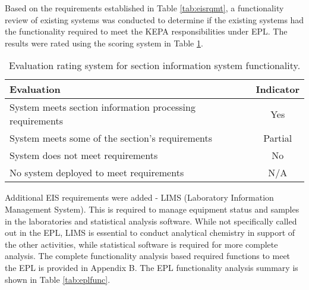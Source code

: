 Based on the requirements established in Table \ref{tab:eisrqmt}, a functionality review of existing systems was conducted to determine if the existing systems had the functionality required to meet the KEPA responsibilities under EPL. The results were rated using the scoring system in Table \ref{tab:funcclass}.

\begin{table}[H]
\centering
\caption{Evaluation rating system for section information system functionality.}
\label{tab:funcclass}
\begin{tabular}{@{}lc@{}}
\toprule
\textbf{Evaluation} & \textbf{Indicator} \\ \midrule
System meets section information processing requirements & Yes \\
System meets some of the section's requirements & Partial \\
System does not meet requirements & No \\
No system deployed to meet requirements & N/A \\ \bottomrule
\end{tabular}
\end{table} 

Additional EIS requirements were added - LIMS (Laboratory Information Management System). This is required to manage equipment status and samples in the laboratories and statistical analysis software. While not specifically called out in the EPL, LIMS is essential to conduct analytical chemistry in support of the other activities, while statistical software is required for more complete analysis. The complete functionality analysis based required functions to meet the EPL is provided in Appendix B. The EPL functionality analysis summary is shown in Table \ref{tab:eplfunc}.

